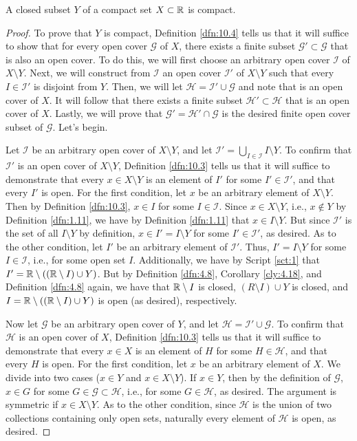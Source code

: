 \documentclass[../main.tex]{subfiles}
\begin{document}
\begin{theorem}\label{trm:10.15}
    A closed subset $Y$ of a compact set $X\subset\mathbb{R}$ is compact.
    \begin{proof}
        To prove that $Y$ is compact, Definition \ref{dfn:10.4} tells us that it will suffice to show that for every open cover $\mathcal{G}$ of $X$, there exists a finite subset $\mathcal{G}'\subset\mathcal{G}$ that is also an open cover. To do this, we will first choose an arbitrary open cover $\mathcal{I}$ of $X\setminus Y$. Next, we will construct from $\mathcal{I}$ an open cover $\mathcal{I}'$ of $X\setminus Y$ such that every $I\in\mathcal{I}'$ is disjoint from $Y$. Then, we will let $\mathcal{H}=\mathcal{I}'\cup\mathcal{G}$ and note that is an open cover of $X$. It will follow that there exists a finite subset $\mathcal{H}'\subset\mathcal{H}$ that is an open cover of $X$. Lastly, we will prove that $\mathcal{G}'=\mathcal{H}'\cap\mathcal{G}$ is the desired finite open cover subset of $\mathcal{G}$. Let's begin.\par\smallskip
        Let $\mathcal{I}$ be an arbitrary open cover of $X\setminus Y$, and let $\mathcal{I}'=\bigcup_{I\in\mathcal{I}}I\setminus Y$. To confirm that $\mathcal{I}'$ is an open cover of $X\setminus Y$, Definition \ref{dfn:10.3} tells us that it will suffice to demonstrate that every $x\in X\setminus Y$ is an element of $I'$ for some $I'\in\mathcal{I}'$, and that every $I'$ is open. For the first condition, let $x$ be an arbitrary element of $X\setminus Y$. Then by Definition \ref{dfn:10.3}, $x\in I$ for some $I\in\mathcal{I}$. Since $x\in X\setminus Y$, i.e., $x\notin Y$ by Definition \ref{dfn:1.11}, we have by Definition \ref{dfn:1.11} that $x\in I\setminus Y$. But since $\mathcal{I}'$ is the set of all $I\setminus Y$ by definition, $x\in I'=I\setminus Y$ for some $I'\in\mathcal{I}'$, as desired. As to the other condition, let $I'$ be an arbitrary element of $\mathcal{I}'$. Thus, $I'=I\setminus Y$ for some $I\in\mathcal{I}$, i.e., for some open set $I$. Additionally, we have by Script \ref{sct:1} that $I'=\mathbb{R}\setminus((\mathbb{R}\setminus I)\cup Y)$. But by Definition \ref{dfn:4.8}, Corollary \ref{cly:4.18}, and Definition \ref{dfn:4.8} again, we have that $\mathbb{R}\setminus I$ is closed, $(R\setminus I)\cup Y$ is closed, and $I=\mathbb{R}\setminus((\mathbb{R}\setminus I)\cup Y)$ is open (as desired), respectively.\par
        Now let $\mathcal{G}$ be an arbitrary open cover of $Y$, and let $\mathcal{H}=\mathcal{I}'\cup\mathcal{G}$. To confirm that $\mathcal{H}$ is an open cover of $X$, Definition \ref{dfn:10.3} tells us that it will suffice to demonstrate that every $x\in X$ is an element of $H$ for some $H\in\mathcal{H}$, and that every $H$ is open. For the first condition, let $x$ be an arbitrary element of $X$. We divide into two cases ($x\in Y$ and $x\in X\setminus Y$). If $x\in Y$, then by the definition of $\mathcal{G}$, $x\in G$ for some $G\in\mathcal{G}\subset\mathcal{H}$, i.e., for some $G\in\mathcal{H}$, as desired. The argument is symmetric if $x\in X\setminus Y$. As to the other condition, since $\mathcal{H}$ is the union of two collections containing only open sets, naturally every element of $\mathcal{H}$ is open, as desired.\par

\end{proof}
\end{theorem}
\end{document}
